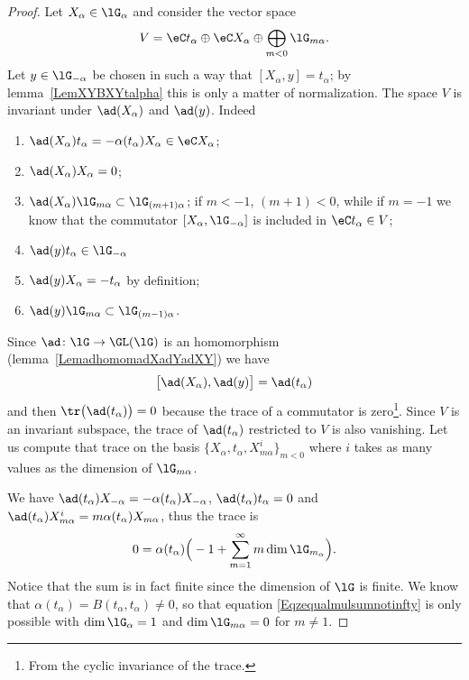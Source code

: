 \begin{proof}
	Let \( X_{\alpha}\in\lG_{\alpha}\) and consider the vector space
	\begin{equation}
		V=\eC t_{\alpha}\oplus\eC X_{\alpha}\oplus\bigoplus_{m<0}\lG_{m\alpha}.
	\end{equation}
	Let \( y\in\lG_{-\alpha}\) be chosen in such a way that \( [X_{\alpha},y]=t_{\alpha}\); by lemma~\ref{LemXYBXYtalpha} this is only a matter of normalization. The space \( V\) is invariant under \( \ad(X_{\alpha})\) and \( \ad(y)\). Indeed
	\begin{enumerate}
		\item
		      \( \ad(X_{\alpha})t_{\alpha}=-\alpha(t_{\alpha})X_{\alpha}\in\eC X_{\alpha}\);
		\item
		      \( \ad(X_{\alpha})X_{\alpha}=0\);
		\item
		      \( \ad(X_{\alpha})\lG_{m\alpha}\subset\lG_{(m+1)\alpha}\); if \( m<-1\), \( (m+1)<0\), while if \( m=-1\) we know that the commutator \( [X_{\alpha},\lG_{-\alpha}]\) is included in \( \eC t_{\alpha}\in V\);
		\item
		      \( \ad(y)t_{\alpha}\in\lG_{-\alpha}\)
		\item
		      \( \ad(y)X_{\alpha}=-t_{\alpha}\) by definition;
		\item
		      \( \ad(y)\lG_{m\alpha}\subset\lG_{(m-1)\alpha}\).
	\end{enumerate}
	Since \( \ad\colon \lG\to \GL(\lG)\) is an homomorphism (lemma~\ref{LemadhomomadXadYadXY}) we have
	\begin{equation}
		\big[ \ad(X_{\alpha}),\ad(y) \big]=\ad(t_{\alpha})
	\end{equation}
	and then \( \tr\big( \ad(t_{\alpha}) \big)=0\) because the trace of a commutator is zero\footnote{From the cyclic invariance of the trace.}. Since \( V\) is an invariant subspace, the trace of \( \ad(t_{\alpha})\) restricted to \( V\) is also vanishing. Let us compute that trace on the basis \( \{ X_{\alpha},t_{\alpha},X^i_{m\alpha} \}_{m<0}\) where \( i\) takes as many values as the dimension of \( \lG_{m\alpha}\).

	We have \( \ad(t_{\alpha})X_{-\alpha}=-\alpha(t_{\alpha})X_{-\alpha}\), \( \ad(t_{\alpha})t_{\alpha}=0\) and \( \ad(t_{\alpha})X^i_{m\alpha}=m\alpha(t_{\alpha})X_{m\alpha}\), thus the trace is
	\begin{equation}    \label{Eqzequalmulsumnotinfty}
		0=\alpha(t_{\alpha})\Big( -1+\sum_{m=1}^{\infty}m\dim\lG_{m_{\alpha}} \Big).
	\end{equation}
	Notice that the sum is in fact finite since the dimension of \( \lG\) is finite. We know that \( \alpha(t_{\alpha})=B(t_{\alpha},t_{\alpha})\neq 0\), so that equation \eqref{Eqzequalmulsumnotinfty} is only possible with \( \dim\lG_{\alpha}=1\) and \( \dim\lG_{m\alpha}=0\) for \( m\neq 1\).
\end{proof}

